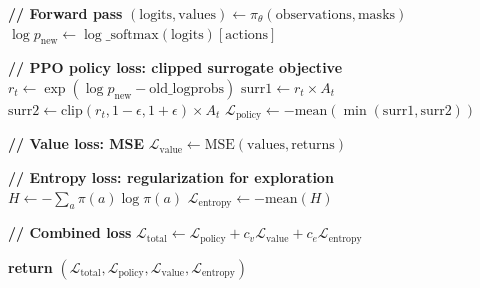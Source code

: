\documentclass[11pt,a4paper]{article}
\begin{document}

\begin{algorithm}[h]
\caption{COMPUTE\_PPO\_LOSS: Policy Clipping + Value + Entropy}
\label{alg:ppo_loss}
\begin{algorithmic}[1]



\State \textbf{// Forward pass}
\State $(\text{logits}, \text{values}) \leftarrow \pi_\theta(\text{observations}, \text{masks})$
\State $\log p_\text{new} \leftarrow \log\_\text{softmax}(\text{logits})[\text{actions}]$

\State \textbf{// PPO policy loss: clipped surrogate objective}
\State $r_t \leftarrow \exp(\log p_\text{new} - \text{old\_logprobs})$ 
\State $\text{surr1} \leftarrow r_t \times A_t$
\State $\text{surr2} \leftarrow \text{clip}(r_t, 1-\epsilon, 1+\epsilon) \times A_t$
\State $\mathcal{L}_\text{policy} \leftarrow -\text{mean}(\min(\text{surr1}, \text{surr2}))$

\State \textbf{// Value loss: MSE}
\State $\mathcal{L}_\text{value} \leftarrow \text{MSE}(\text{values}, \text{returns})$

\State \textbf{// Entropy loss: regularization for exploration}
\State $H \leftarrow -\sum_a \pi(a) \log \pi(a)$ 
\State $\mathcal{L}_\text{entropy} \leftarrow -\text{mean}(H)$ 

\State \textbf{// Combined loss}
\State $\mathcal{L}_\text{total} \leftarrow \mathcal{L}_\text{policy} + c_v \mathcal{L}_\text{value} + c_e \mathcal{L}_\text{entropy}$

\State \textbf{return} $(\mathcal{L}_\text{total}, \mathcal{L}_\text{policy}, \mathcal{L}_\text{value}, \mathcal{L}_\text{entropy})$

\end{algorithmic}
\end{algorithm}
\end{document}
